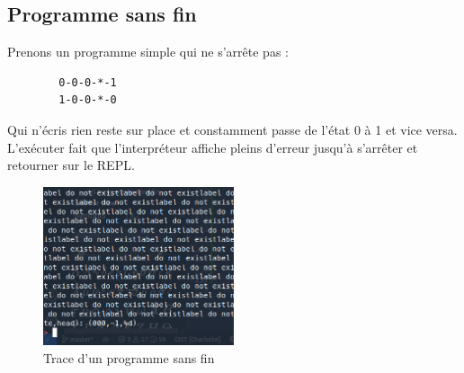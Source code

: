 \documentclass[11pt,colorlinks=true,a4paper]{article}
\begin{document}
    \subsection{Programme sans fin}
    Prenons un programme simple qui ne s'arrête pas :
    \begin{lstlisting}
        0-0-0-*-1
        1-0-0-*-0
    \end{lstlisting}
    Qui n'écris rien reste sur place et constamment passe de l'état 0 à 1 et vice versa.
    L'exécuter fait que l'interpréteur affiche pleins d'erreur jusqu'à s'arrêter et retourner sur le REPL.
    \begin{figure}[H]
        \center 
        \includegraphics[width=0.5\textwidth]{img/error.png}
        \caption{Trace d'un programme sans fin}
    \end{figure}
\end{document}
